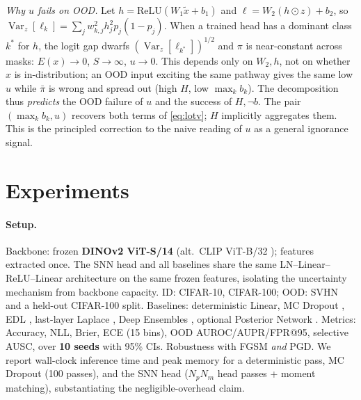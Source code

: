 \documentclass[11pt]{article}
\newcommand{\Var}{\operatorname{Var}}
\begin{document}
\noindent\emph{Why $u$ fails on OOD.}
Let $h=\mathrm{ReLU}(W_1\tilde x+b_1)$ and $\ell=W_2(h\odot z)+b_2$, so
$\Var_z[\ell_k]=\sum_j w_{k,j}^2 h_j^2 p_j(1-p_j)$. When a trained head has a dominant
class $k^*$ for $h$, the logit gap dwarfs $(\Var_z[\ell_{k^*}])^{1/2}$ and $\pi$ is
near-constant across masks: $E(x)\!\to\!0$, $S\!\to\!\infty$, $u\!\to\!0$. This depends
only on $W_2,h$, not on whether $x$ is in-distribution; an OOD input exciting the same
pathway gives the same low $u$ while $\bar\pi$ is wrong and spread out (high $H$, low
$\max_k b_k$). The decomposition thus \emph{predicts} the OOD failure of $u$ and the
success of $H,\neg b$. The pair $(\max_k b_k, u)$ recovers both terms of \eqref{eq:lotv};
$H$ implicitly aggregates them. This is the principled correction to the naive reading
of $u$ as a general ignorance signal.

\section{Experiments}
\label{sec:exp}
\paragraph{Setup.}
Backbone: frozen \textbf{DINOv2 ViT-S/14} \citep{oquab2024} %
(alt.\ CLIP ViT-B/32 \citep{radford2021}); %
features extracted once. The SNN head and all baselines share the same
LN--Linear--ReLU--Linear architecture on the same frozen features, isolating the
uncertainty mechanism from backbone capacity. ID: CIFAR-10, CIFAR-100; OOD: SVHN and a
held-out CIFAR-100 split. Baselines: deterministic Linear, MC Dropout \citep{gal2016b},
EDL \citep{sensoy2018}, last-layer Laplace \citep{daxberger2021}, Deep Ensembles
\citep{lakshminarayanan2017}, optional Posterior Network \citep{charpentier2020}.
Metrics: Accuracy, NLL, Brier, ECE (15 bins), OOD AUROC/AUPR/FPR@95, selective AUSC,
over \textbf{10 seeds} with 95\% CIs. Robustness with FGSM \emph{and} PGD. We report
wall-clock inference time and peak memory for a deterministic pass, MC Dropout (100
passes), and the SNN head ($N_pN_m$ head passes + moment matching), substantiating the
negligible-overhead claim.

\end{document}
